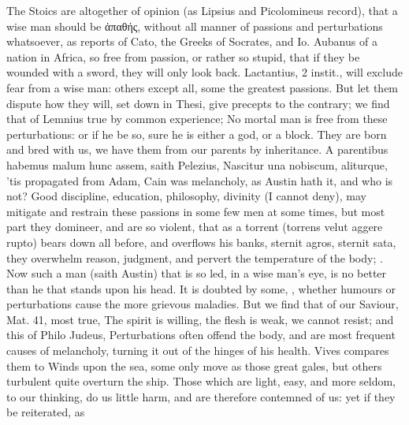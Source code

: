 {{The Stoics are altogether of opinion (as Lipsius and
Picolomineus record), that a wise man should be \textgreek{ἀπαθής}, without
all manner of passions and perturbations whatsoever, as \Seneca
reports of Cato, the  Greeks of Socrates, and Io. Aubanus
of a nation in Africa, so free from passion, or rather so stupid, that
if they be wounded with a sword, they will only look back.
Lactantius, 2 instit., will exclude fear from a wise man: others
except all, some the greatest passions. But let them dispute how they
will, set down in Thesi, give precepts to the contrary; we find that of
Lemnius true by common experience; No mortal man is free from
these perturbations: or if he be so, sure he is either a god, or a
block. They are born and bred with us, we have them from our parents by
inheritance. A parentibus habemus malum hunc assem, saith
Pelezius, Nascitur una nobiscum, aliturque, 'tis propagated from
Adam, Cain was melancholy, as Austin hath it, and who is not?
Good discipline, education, philosophy, divinity (I cannot deny), may
mitigate and restrain these passions in some few men at some times, but
most part they domineer, and are so violent, that as a torrent
(torrens velut aggere rupto) bears down all before, and overflows his
banks, sternit agros, sternit sata}, they overwhelm reason, judgment, and pervert the
temperature of the body; . Now such a man (saith Austin) that is so led, in a wise
man's eye, is no better than he that stands upon his head. It is
doubted by some, ,
whether humours or perturbations cause the more grievous maladies. But
we find that of our Saviour, Mat.  41, most true, The spirit is
willing, the flesh is weak, we cannot resist; and this of Philo
Judeus, Perturbations often offend the body, and are most frequent
causes of melancholy, turning it out of the hinges of his health. Vives
compares them to Winds upon the sea, some only move as those
great gales, but others turbulent quite overturn the ship. Those which
are light, easy, and more seldom, to our thinking, do us little harm,
and are therefore contemned of us: yet if they be reiterated, as
}
